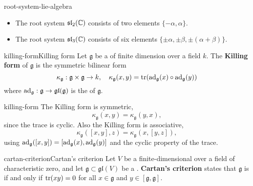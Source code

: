 \begin{example}{root-system-lie-algebra}
    \begin{itemize}
        \item The root system $\mathfrak{sl}_2(\mathbb{C})$ consists of two elements $\{ -\alpha, \alpha \}$.
        \item The root system $\mathfrak{sl}_3(\mathbb{C})$ consists of six elements $\{ \pm \alpha, \pm \beta, \pm (\alpha + \beta) \}$.
    \end{itemize}
\end{example}

\begin{topic}{killing-form}{Killing form}
    Let $\mathfrak{g}$ be a  of finite dimension over a field $k$. The \textbf{Killing form} of $\mathfrak{g}$ is the symmetric bilinear form
    \[ \kappa_\mathfrak{g} : \mathfrak{g} \times \mathfrak{g} \to k, \quad \kappa_\mathfrak{g}(x, y) = \textup{tr}(\textup{ad}_{\mathfrak{g}}(x) \circ \textup{ad}_{\mathfrak{g}}(y)) \]
    where $\textup{ad}_\mathfrak{g} : \mathfrak{g} \to \mathfrak{gl}(\mathfrak{g})$ is the  of $\mathfrak{g}$.
\end{topic}

\begin{example}{killing-form}
    The Killing form is symmetric,
    \[ \kappa_\mathfrak{g}(x, y) = \kappa_\mathfrak{g}(y, x) , \]
    since the trace is cyclic. Also the Killing form is associative,
    \[ \kappa_\mathfrak{g}([x, y], z) = \kappa_\mathfrak{g}(x, [y, z]) , \]
    using $\textup{ad}_\mathfrak{g}([x, y]) = [\textup{ad}_\mathfrak{g}(x), \textup{ad}_\mathfrak{g}(y)]$ and the cyclic property of the trace.
\end{example}

\begin{topic}{cartan-criterion}{Cartan's criterion}
    Let $V$ be a finite-dimensional  over a field of characteristic zero, and let $\mathfrak{g} \subset \mathfrak{gl}(V)$ be a . \textbf{Cartan's criterion} states that $\mathfrak{g}$ is  if and only if $\operatorname{tr}(xy) = 0$ for all $x \in \mathfrak{g}$ and $y \in [\mathfrak{g}, \mathfrak{g}]$.
\end{topic}

